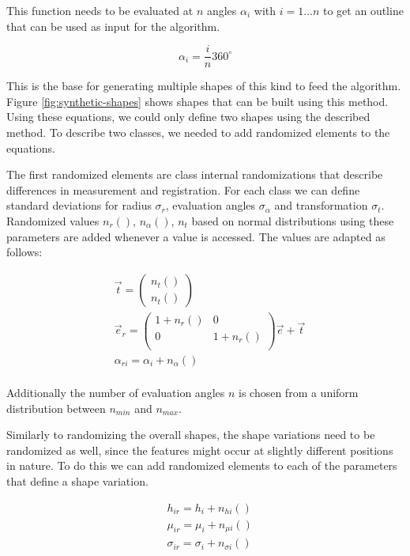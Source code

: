 \documentclass[pdftex,12pt,a4paper]{report}
\begin{document}
This function needs to be evaluated at $n$ angles $\alpha_i$ with $i = 1 ... n$ to get an outline that can be used as input for the algorithm.

\begin{equation}
\alpha_i = \frac{i}{n} 360^{\circ}
\end{equation}

This is the base for generating multiple shapes of this kind to feed the algorithm. Figure \ref{fig:synthetic-shapes} shows shapes that can be built using this method. Using these equations, we could only define two shapes using the described method. To describe two classes, we needed to add randomized elements to the equations.

The first randomized elements are class internal randomizations that describe differences in measurement and registration. For each class we can define standard deviations for radius $\sigma_r$, evaluation angles $\sigma_\alpha$ and transformation $\sigma_t$. Randomized values $n_r()$, $n_\alpha()$, $n_t$ based on normal distributions using these parameters are added whenever a value is accessed. The values are adapted as follows:

\begin{equation}
\begin{split}
& \vec{t} = \left( \begin{array}{c}
n_t() \\
n_t()
\end{array} \right) \\
& \vec{e}_r = \begin{pmatrix}
1 + n_r() & 0 \\
0 & 1 + n_r() \\
\end{pmatrix} \vec{e}  + \vec{t} \\
& \alpha_{ri} = \alpha_i + n_\alpha() \\
\end{split}
\end{equation}

Additionally the number of evaluation angles $n$ is chosen from a uniform distribution between $n_{min}$ and $n_{max}$.

Similarly to randomizing the overall shapes, the shape variations need to be randomized as well, since the features might occur at slightly different positions in nature. To do this we can add randomized elements to each of the parameters that define a shape variation.

\begin{equation}
\begin{split}
& h_{ir} = h_i + n_{hi}() \\
& \mu_{ir} = \mu_i + n_{\mu i}() \\
& \sigma_{ir} = \sigma_i + n_{\sigma i}() \\
\end{split}
\end{equation}
\end{document}
